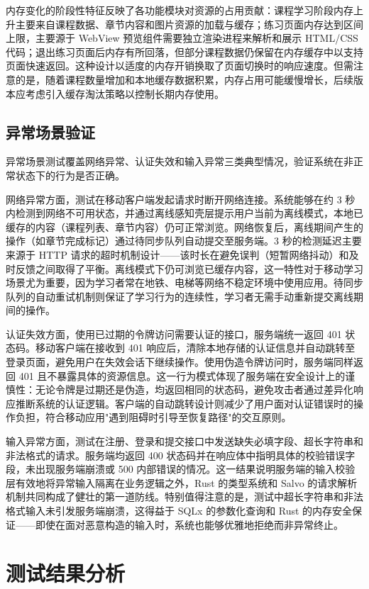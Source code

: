 内存变化的阶段性特征反映了各功能模块对资源的占用贡献：课程学习阶段内存上升主要来自课程数据、章节内容和图片资源的加载与缓存；练习页面内存达到区间上限，主要源于 WebView 预览组件需要独立渲染进程来解析和展示 HTML/CSS 代码；退出练习页面后内存有所回落，但部分课程数据仍保留在内存缓存中以支持页面快速返回。这种设计以适度的内存开销换取了页面切换时的响应速度。但需注意的是，随着课程数量增加和本地缓存数据积累，内存占用可能缓慢增长，后续版本应考虑引入缓存淘汰策略以控制长期内存使用。

\subsection{异常场景验证}

异常场景测试覆盖网络异常、认证失效和输入异常三类典型情况，验证系统在非正常状态下的行为是否正确。

网络异常方面，测试在移动客户端发起请求时断开网络连接。系统能够在约 3 秒内检测到网络不可用状态，并通过离线感知壳层提示用户当前为离线模式，本地已缓存的内容（课程列表、章节内容）仍可正常浏览。网络恢复后，离线期间产生的操作（如章节完成标记）通过待同步队列自动提交至服务端。3 秒的检测延迟主要来源于 HTTP 请求的超时机制设计——该时长在避免误判（短暂网络抖动）和及时反馈之间取得了平衡。离线模式下仍可浏览已缓存内容，这一特性对于移动学习场景尤为重要，因为学习者常在地铁、电梯等网络不稳定环境中使用应用。待同步队列的自动重试机制则保证了学习行为的连续性，学习者无需手动重新提交离线期间的操作。

认证失效方面，使用已过期的令牌访问需要认证的接口，服务端统一返回 401 状态码。移动客户端在接收到 401 响应后，清除本地存储的认证信息并自动跳转至登录页面，避免用户在失效会话下继续操作。使用伪造令牌访问时，服务端同样返回 401 且不暴露具体的资源信息。这一行为模式体现了服务端在安全设计上的谨慎性：无论令牌是过期还是伪造，均返回相同的状态码，避免攻击者通过差异化响应推断系统的认证逻辑。客户端的自动跳转设计则减少了用户面对认证错误时的操作负担，符合移动应用"遇到阻碍时引导至恢复路径"的交互原则。

输入异常方面，测试在注册、登录和提交接口中发送缺失必填字段、超长字符串和非法格式的请求。服务端均返回 400 状态码并在响应体中指明具体的校验错误字段，未出现服务端崩溃或 500 内部错误的情况。这一结果说明服务端的输入校验层有效地将异常输入隔离在业务逻辑之外，Rust 的类型系统和 Salvo 的请求解析机制共同构成了健壮的第一道防线。特别值得注意的是，测试中超长字符串和非法格式输入未引发服务端崩溃，这得益于 SQLx 的参数化查询和 Rust 的内存安全保证——即使在面对恶意构造的输入时，系统也能够优雅地拒绝而非异常终止。

\section{测试结果分析}

